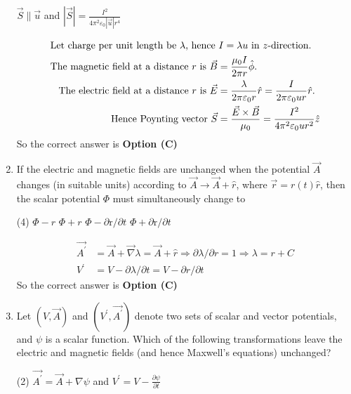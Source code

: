 \begin{enumerate}
\begin{tasks}
		\task[\textbf{d.}] $\vec{S} \| \vec{u}$ and $|\vec{S}|=\frac{I^{2}}{4 \pi^{2} \varepsilon_{0}|\vec{u}| r^{4}}$
	\end{tasks}
\begin{answer}
	\begin{align*}
	\intertext{Let charge per unit length be $\lambda$, hence $I=\lambda u$ in $z$-direction.}
	\text{The magnetic field at a distance $r$ is }\vec{B}&=\frac{\mu_{0} I}{2 \pi r} \hat{\phi}.\\
	\text{The electric field at a distance $r$ is }\vec{E}&=\frac{\lambda}{2 \pi \varepsilon_{0} r} \hat{r}=\frac{I}{2 \pi \varepsilon_{0} u r} \hat{r}.\\
	\text{Hence Poynting vector }\vec{S}&=\frac{\vec{E} \times \vec{B}}{\mu_{0}}=\frac{I^{2}}{4 \pi^{2} \varepsilon_{0} u r^{2}} \hat{z}
	\end{align*}
	So the correct answer is \textbf{Option (C)}
\end{answer}
	\item
	 If the electric and magnetic fields are unchanged when the potential $\vec{A}$ changes (in suitable units) according to $\vec{A} \rightarrow \vec{A}+\hat{r}$, where $\vec{r}=r(t) \hat{r}$, then the scalar potential $\Phi$ must simultaneously change to
	{	}
	\begin{tasks}(4)
		\task[\textbf{A.}] $\Phi-r$
		\task[\textbf{B.}] $\Phi+r$
		\task[\textbf{C.}] $\Phi-\partial \mathrm{r} / \partial t$
		\task[\textbf{D.}] $\Phi+\partial \mathrm{r} / \partial t$
	\end{tasks}
\begin{answer}
	\begin{align*}
	\overrightarrow{A^{\prime}}&=\vec{A}+\vec{\nabla} \lambda=\vec{A}+\hat{r} \Rightarrow \partial \lambda / \partial r=1 \Rightarrow \lambda=r+C\\
	V^{\prime}&=V-\partial \lambda / \partial t=V-\partial r / \partial t
	\end{align*}
	So the correct answer is \textbf{Option (C)}
\end{answer}
	\item
	 Let $(V, \vec{A})$ and $\left(V^{\prime}, \overrightarrow{A^{\prime}}\right)$ denote two sets of scalar and vector potentials, and $\psi$ is a scalar function. Which of the following transformations leave the electric and magnetic fields (and hence Maxwell's equations) unchanged?
	{}
	\begin{tasks}(2)
		\task[\textbf{A.}] $\overrightarrow{A^{\prime}}=\vec{A}+\nabla \psi$ and $V^{\prime}=V-\frac{\partial \psi}{\partial t}$

\end{tasks}
\end{enumerate}
